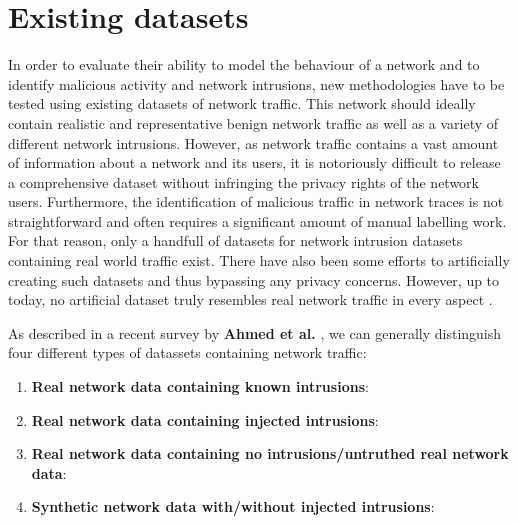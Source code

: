 \section{Existing datasets}

In order to evaluate their ability to model the behaviour of a network and to identify malicious activity and network intrusions, new methodologies have to be tested using existing datasets of network traffic. This network should ideally contain realistic and representative benign network traffic as well as a variety of different network intrusions. However, as  network traffic contains a vast amount of information about a network and its users, it is notoriously difficult to release a comprehensive dataset without infringing the privacy rights of the network users. Furthermore, the identification of malicious traffic in network traces is not straightforward and often requires a significant amount of manual labelling work.
For that reason, only a handfull of datasets for network intrusion datasets containing real world traffic exist. There have also been some efforts to artificially creating such datasets and thus bypassing any privacy concerns. However, up to today, no artificial dataset truly resembles real network traffic in every aspect \cite{nisioti2018intrusion}.

As described in a recent survey by \textbf{Ahmed et al.} \cite{ahmed2016survey}, we can generally distinguish four different types of datassets containing network traffic:

\begin{enumerate}

\item \textbf{Real network data containing known intrusions}: 

\item \textbf{Real network data containing injected intrusions}:

\item \textbf{Real network data containing no intrusions/untruthed real network data}:

\item \textbf{Synthetic network data with/without injected intrusions}:

\end{enumerate}


